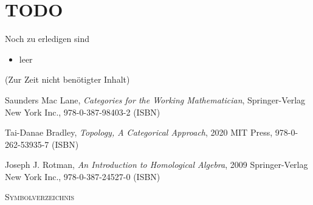 \documentclass[a4paper]{amsart}
\theoremstyle{definition}
\begin{document}
\section{TODO}
\begin{backup}
Noch zu erledigen sind
\begin{itemize}
   \item leer
\end{itemize}
\end{backup}

\begin{backup}
    (Zur Zeit nicht benötigter Inhalt)
\end{backup}

\begin{thebibliography}{9}

      Saunders Mac Lane, \emph{Categories for the Working Mathematician},
      Springer-Verlag New York Inc., 978-0-387-98403-2 (ISBN)
      
      Tai-Danae Bradley, \emph{Topology, A Categorical Approach},
      2020 MIT Press, 978-0-262-53935-7 (ISBN)

   	Joseph J. Rotman, \emph{An Introduction to Homological Algebra},
   	2009 Springer-Verlag New York Inc., 978-0-387-24527-0 (ISBN)
      
\end{thebibliography}

\begin{large}
    \centerline{\textsc{Symbolverzeichnis}}
\end{large}
\bigskip
\end{document}
